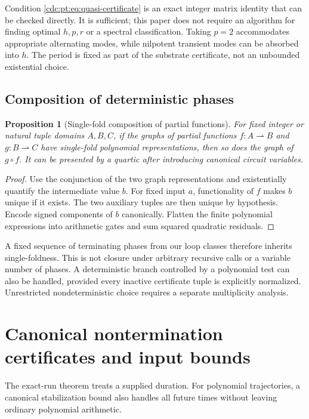 \documentclass[11pt,a4paper]{article}
\newtheorem{proposition}[proposition]{Proposition}
\theoremstyle{definition}
\theoremstyle{remark}
\newcommand{\srctag}[1]{\texorpdfstring{\hspace{0.5em}{\normalfont\small\color{accent}[#1]}}{ [#1]}}
\begin{document}
Condition \eqref{cdc:pt:eq:quasi-certificate} is an exact integer matrix identity
that can be checked directly. It is sufficient; this paper does not require
an algorithm for finding optimal $h,p,r$ or a spectral classification.
Taking $p=2$ accommodates appropriate alternating modes, while nilpotent
transient modes can be absorbed into $h$. The period is fixed as part of
the substrate certificate, not an unbounded existential choice.

\subsection{Composition of deterministic phases}
\begin{proposition}[Single-fold composition of partial functions]
\label{cdc:pt:prop:composition}
For fixed integer or natural tuple domains $A,B,C$, if the graphs of
partial functions $f:A\rightharpoonup B$ and $g:B\rightharpoonup C$
have single-fold polynomial representations, then
so does the graph of $g\circ f$. It can be presented by a quartic after
introducing canonical circuit variables.
\end{proposition}
\begin{proof}
Use the conjunction of the two graph representations and existentially
quantify the intermediate value $b$. For fixed input $a$, functionality
of $f$ makes $b$ unique if it exists. The two auxiliary tuples are then
unique by hypothesis. Encode signed components of $b$ canonically.
Flatten the finite polynomial expressions into arithmetic gates and sum
squared quadratic residuals.
\end{proof}
A fixed sequence of terminating phases from our loop classes therefore
inherits single-foldness. This is not closure under arbitrary recursive
calls or a variable number of phases. A deterministic branch controlled
by a polynomial test can also be handled, provided every inactive
certificate tuple is explicitly normalized. Unrestricted nondeterministic
choice requires a separate multiplicity analysis.

\section{Canonical nontermination certificates and input bounds\srctag{02}}
\label{cdc:pt:sec:nontermination}
The exact-run theorem treats a supplied duration. For polynomial
trajectories, a canonical stabilization bound also handles all future
times without leaving ordinary polynomial arithmetic.
\end{document}
